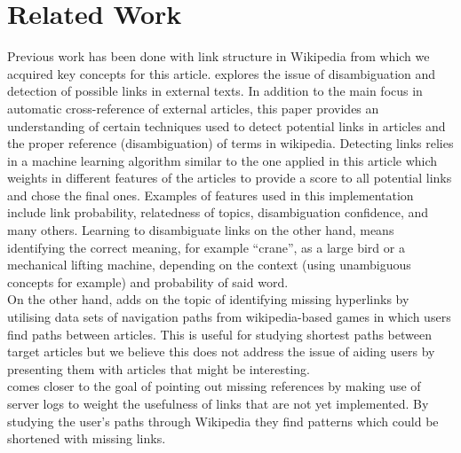\section{Related Work}
Previous work has been done with link structure in Wikipedia from which we acquired key concepts for this article. \cite{learning_link} explores the issue of disambiguation and detection of possible links in external texts. In addition to the main focus in automatic cross-reference of external articles, this paper provides an understanding of certain techniques used to detect potential links in articles and the proper reference (disambiguation) of terms in wikipedia. Detecting links relies in a machine learning algorithm similar to the one applied in this article which weights in different features of the articles to provide a score to all potential links and chose the final ones. Examples of features used in this implementation include link probability, relatedness of topics, disambiguation confidence, and many others.  Learning to disambiguate links on the other hand, means identifying the correct meaning, for example ``crane'', as a large bird or a mechanical lifting machine, depending on the context (using unambiguous concepts for example) and probability of said word. \\
On the other hand, \cite{west} adds on the topic of identifying missing hyperlinks by utilising data sets of navigation paths from wikipedia-based games in which users find paths between articles. This is useful for studying shortest paths between target articles but we believe this does not address the issue of aiding users by presenting them with articles that might be interesting.\\
\cite{paranjape} comes closer to the goal of pointing out missing references by making use of server logs to weight the usefulness of links that are not yet implemented. By studying the user's paths through Wikipedia they find patterns which could be shortened with missing links.